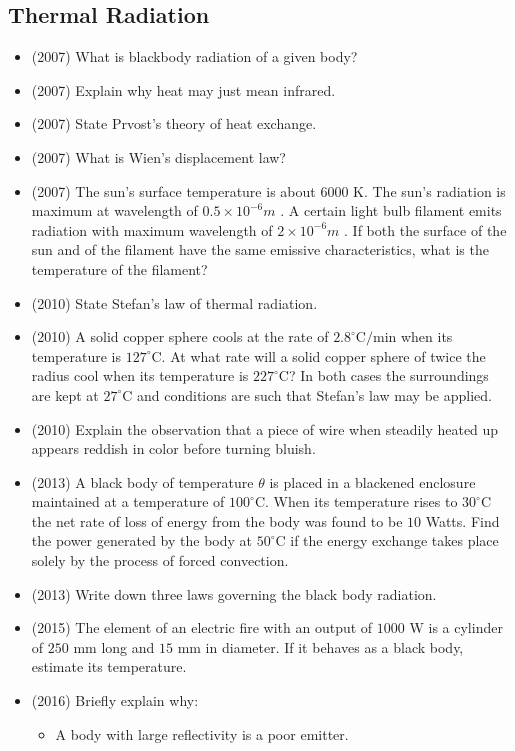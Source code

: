 \documentclass{article}
\begin{document}
\subsection{Thermal Radiation}
\begin{itemize}
\item (2007)  What is blackbody radiation of a given body?
\item (2007)  Explain why heat may just mean infrared.
\item (2007)  State Prvost's theory of heat exchange.
\item (2007)  What is Wien's displacement law?
\item (2007)  The sun's surface temperature is about $ 6000$ K.  The sun's radiation is maximum at wavelength of $ 0.5\times10^{-6}m$ .  A certain light bulb filament emits radiation with maximum wavelength of $ 2\times10^{-6}m$ .  If both the surface of the sun and of the filament have the same emissive characteristics, what is the temperature of the filament?
\item (2010)  State Stefan’s law of thermal radiation.
\item (2010)  A solid copper sphere cools at the rate of $ 2.8^{\circ}$C$/$min when its temperature is $ 127^{\circ}$C. At what rate will a solid copper sphere of twice the radius cool when its temperature is $ 227^{\circ}$C? In both cases the surroundings are kept at $ 27^{\circ}$C and conditions are such that  Stefan’s law may be applied.
\item (2010)  Explain the observation that a piece of wire when steadily heated up appears reddish in color before turning bluish. 
\item (2013)  A black body of temperature $ \theta $ is placed in a blackened enclosure maintained at a temperature of $ 100^{\circ}$C. When its temperature rises to $ 30^{\circ}$C the net rate of loss of energy from the body was found to be $ 10$ Watts. Find the power generated by the body at $ 50^{\circ}$C if the energy exchange takes place solely by the process of forced convection.
\item (2013)  Write down three laws governing the black body radiation.
\item (2015)  The element of an electric fire with an output of $ 1000$ W is a cylinder of $ 250$ mm long and $ 15$ mm in diameter. If it behaves as a black body, estimate its temperature.
\item (2016)  Briefly explain why: 
 \begin{itemize}
\item A body with large reflectivity is a poor emitter. 

\end{itemize}
\end{itemize}
\end{document}
